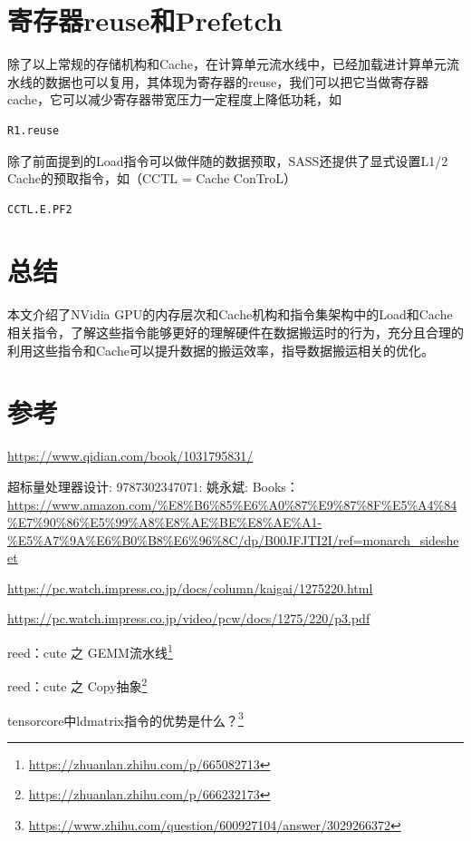 \section{寄存器reuse和Prefetch}

除了以上常规的存储机构和Cache，在计算单元流水线中，已经加载进计算单元流水线的数据也可以复用，其体现为寄存器的reuse，我们可以把它当做寄存器cache，它可以减少寄存器带宽压力一定程度上降低功耗，如

\begin{lstlisting}
R1.reuse
\end{lstlisting}

除了前面提到的Load指令可以做伴随的数据预取，SASS还提供了显式设置L1/2 Cache的预取指令，如（CCTL = Cache ConTroL）

\begin{lstlisting}
CCTL.E.PF2
\end{lstlisting}

\section{总结}

本文介绍了NVidia GPU的内存层次和Cache机构和指令集架构中的Load和Cache相关指令，了解这些指令能够更好的理解硬件在数据搬运时的行为，充分且合理的利用这些指令和Cache可以提升数据的搬运效率，指导数据搬运相关的优化。

\section{参考}

\url{https://www.qidian.com/book/1031795831/}

超标量处理器设计: 9787302347071: 姚永斌: Books：\url{https://www.amazon.com/%E8%B6%85%E6%A0%87%E9%87%8F%E5%A4%84%E7%90%86%E5%99%A8%E8%AE%BE%E8%AE%A1-%E5%A7%9A%E6%B0%B8%E6%96%8C/dp/B00JFJTI2I/ref=monarch_sidesheet}

\url{https://pc.watch.impress.co.jp/docs/column/kaigai/1275220.html}

\url{https://pc.watch.impress.co.jp/video/pcw/docs/1275/220/p3.pdf}

reed：cute 之 GEMM流水线\footnote{\url{https://zhuanlan.zhihu.com/p/665082713}}

reed：cute 之 Copy抽象\footnote{\url{https://zhuanlan.zhihu.com/p/666232173}}

tensorcore中ldmatrix指令的优势是什么？\footnote{\url{https://www.zhihu.com/question/600927104/answer/3029266372}}
